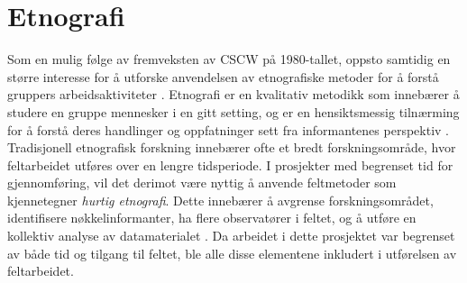 \section{Etnografi}
\label{section:etnografi} 

Som en mulig følge av fremveksten av CSCW på 1980-tallet, oppsto samtidig en større interesse for å utforske anvendelsen av etnografiske metoder for å forstå gruppers arbeidsaktiviteter \citep{Blomberg93}. Etnografi er en kvalitativ metodikk som innebærer å studere en gruppe mennesker i en gitt setting, og er en hensiktsmessig tilnærming for å forstå deres handlinger og oppfatninger sett fra informantenes perspektiv \citep{Blomberg93, Reeves08, Nardi97}. Tradisjonell etnografisk forskning innebærer ofte et bredt forskningsområde, hvor feltarbeidet utføres over en lengre tidsperiode. I prosjekter med begrenset tid for gjennomføring, vil det derimot være nyttig å anvende feltmetoder som kjennetegner \textit{hurtig etnografi}. Dette innebærer å avgrense forskningsområdet, identifisere nøkkelinformanter, ha flere observatører i feltet, og å utføre en kollektiv analyse av datamaterialet \citep{Millen00}. Da arbeidet i dette prosjektet var begrenset av både tid og tilgang til feltet, ble alle disse elementene inkludert i utførelsen av feltarbeidet.



